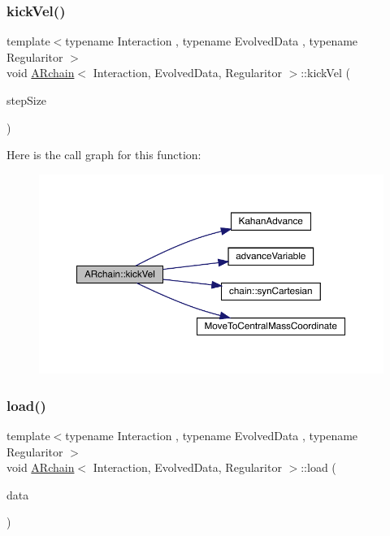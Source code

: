 \subsubsection{\texorpdfstring{kick\+Vel()}{kickVel()}}
{\footnotesize\ttfamily template$<$typename Interaction , typename Evolved\+Data , typename Regularitor $>$ \\
void \mbox{\hyperlink{class_a_rchain}{A\+Rchain}}$<$ Interaction, Evolved\+Data, Regularitor $>$\+::kick\+Vel (\begin{DoxyParamCaption}\item[{\mbox{\hyperlink{class_a_rchain_a707e42a79e4744424a34c9007e84ee07}{Scalar}}}]{step\+Size }\end{DoxyParamCaption})\hspace{0.3cm}{\ttfamily [private]}}

Here is the call graph for this function\+:
\nopagebreak
\begin{figure}[H]
\begin{center}
\leavevmode
\includegraphics[width=350pt]{class_a_rchain_a0b073cd82321047d7fafda59cef998ef_cgraph}
\end{center}
\end{figure}
\mbox{\label{class_a_rchain_a7edf1240a094d55df222c816659dced0}} 
\subsubsection{\texorpdfstring{load()}{load()}}
{\footnotesize\ttfamily template$<$typename Interaction , typename Evolved\+Data , typename Regularitor $>$ \\
void \mbox{\hyperlink{class_a_rchain}{A\+Rchain}}$<$ Interaction, Evolved\+Data, Regularitor $>$\+::load (\begin{DoxyParamCaption}\item[{\mbox{\hyperlink{class_a_rchain_a829aca51411c08ffd518294770a374d5}{Plain\+Array}} \&}]{data }\end{DoxyParamCaption})}

